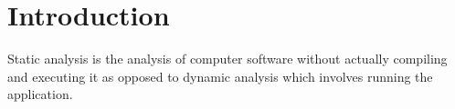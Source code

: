 \section{Introduction}

Static analysis is the analysis of computer software without actually compiling and executing it as opposed to dynamic analysis\cite{dynamic_analysis} which involves running the application.